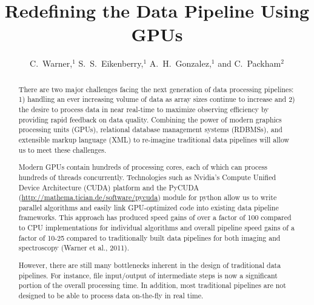 

\resetcounters




\title{Redefining the Data Pipeline Using GPUs}
\author{C.~Warner,$^1$ S.~S.~Eikenberry,$^1$ A.~H.~Gonzalez,$^1$ and C.~Packham$^2$
}


\begin{abstract}
There are two major challenges facing the next generation of data processing pipelines: 1) handling an ever increasing volume of data as array sizes continue to increase and 2) the desire to process data in near real-time to maximize observing efficiency by providing rapid feedback on data quality.  Combining the power of modern graphics processing units (GPUs), relational database management systems (RDBMSs), and extensible markup language (XML) to re-imagine traditional data pipelines will allow us to meet these challenges.

Modern GPUs contain hundreds of processing cores, each of which can process hundreds of threads concurrently.  Technologies such as Nvidia's Compute Unified Device Architecture (CUDA) platform and the PyCUDA (\url{http://mathema.tician.de/software/pycuda}) module for python allow us to write parallel algorithms and easily link GPU-optimized code into existing data pipeline frameworks.  This approach has produced speed gains of over a factor of 100 compared to CPU implementations for individual algorithms and overall pipeline speed gains of a factor of 10-25 compared to traditionally built data pipelines for both imaging and spectroscopy (Warner et al., 2011).

However, there are still many bottlenecks inherent in the design of traditional data pipelines.  For instance, file input/output of intermediate steps is now a significant portion of the overall processing time.  In addition, most traditional pipelines are not designed to be able to process data on-the-fly in real time.


\end{abstract}
